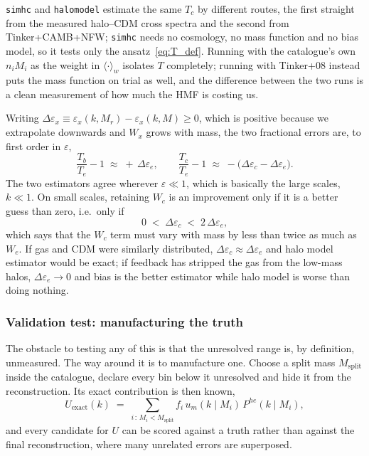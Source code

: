 \documentclass{article}
\begin{document}
\noindent
\texttt{simhc} and \texttt{halomodel} estimate the same $T_c$ by different routes, the first straight from the measured halo--CDM cross spectra and the second from Tinker+CAMB+NFW; \texttt{simhc} needs no cosmology, no mass function and no bias model, so it tests only the ansatz~\eqref{eq:T_def}. Running with the catalogue's own $n_iM_i$ as the weight in $\langle\cdot\rangle_w$ isolates $T$ completely; running with Tinker+08 instead puts the mass function on trial as well, and the difference between the two runs is a clean measurement of how much the HMF is costing us.

Writing $\Delta \varepsilon_x \equiv \varepsilon_x(k,M_r) - \varepsilon_x(k,M) \ge 0$, which is positive because we extrapolate downwards and $W_x$ grows with mass, the two fractional errors are, to first order in $\varepsilon$,
\begin{equation} \label{eq:mode_errors}
    \frac{T_b}{T_e} - 1 \;\approx\; +\,\Delta \varepsilon_e,
    \qquad
    \frac{T_c}{T_e} - 1 \;\approx\; -\big(\Delta \varepsilon_c - \Delta \varepsilon_e\big).
\end{equation}
The two estimators agree wherever $\varepsilon \ll 1$, which is basically the large scales, $k \ll 1$. On small scales, retaining $W_c$ is an improvement only if it is a better guess than zero, i.e.\ only if
\begin{equation} \label{eq:criterion}
    0 \;<\; \Delta \varepsilon_c \;<\; 2 \, \Delta \varepsilon_e ,
\end{equation}
which says that the $W_c$ term must vary with mass by less than twice as much as $W_e$. If gas and CDM were similarly distributed, $\Delta \varepsilon_c \approx \Delta \varepsilon_e$ and halo model estimator would be exact; if feedback has stripped the gas from the low-mass halos, $\Delta \varepsilon_e \to 0$ and bias is the better estimator while halo model is worse than doing nothing. 

\subsubsection{Validation test: manufacturing the truth}

The obstacle to testing any of this is that the unresolved range is, by definition, unmeasured. The way around it is to manufacture one. Choose a split mass $M_\mathrm{split}$ inside the catalogue, declare every bin below it unresolved and hide it from the reconstruction. Its exact contribution is then known,
\begin{equation} \label{eq:expA_exact}
    U_\mathrm{exact}(k) \;=\; \sum_{i \,:\, M_i < M_\mathrm{split}} f_i \, u_m(k \mid M_i) \, P^{he}(k \mid M_i),
\end{equation}
and every candidate for $U$ can be scored against a truth rather than against the final reconstruction, where many unrelated errors are superposed.
\end{document}
